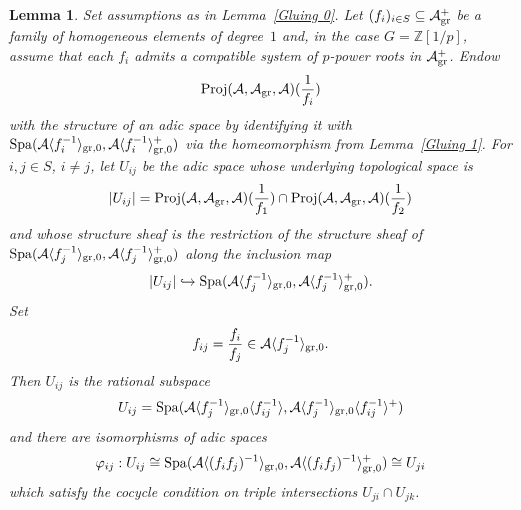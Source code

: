 \documentclass[12pt,twoside,a4paper]{article}
\newtheorem{lemma}[thm]{Lemma}
\theoremstyle{definition}
\theoremstyle{remark}
\newcommand\gr{{\rm gr}}
\newcommand\Proj{{\rm Proj}}
\newcommand\Spa{{\rm Spa}}
\begin{document}
\begin{lemma}\label{Gluing 1, part 4}Set assumptions as in Lemma~\ref{Gluing 0}. Let $(f_{i})_{i\in S} \subseteq \mathcal{A}_{\gr}^{+}$ be a family of homogeneous elements of degree~$1$ and, in the case $G=\mathbb{Z}[1/p]$, assume that each $f_{i}$ admits a compatible system of $p$-power roots in $\mathcal{A}_{\gr}^{+}$. Endow \begin{equation*}\Proj(\mathcal{A}, \mathcal{A}_{\gr}, \mathcal{A})(\frac{1}{f_{i}})\end{equation*}with the structure of an adic space by identifying it with $\Spa(\mathcal{A}\langle f_{i}^{-1}\rangle_{\gr,0}, \mathcal{A}\langle f_{i}^{-1}\rangle_{\gr,0}^{+})$ via the homeomorphism from Lemma~\ref{Gluing 1}. For $i, j\in S$, $i\neq j$, let $U_{ij}$ be the adic space whose underlying topological space is \begin{equation*}\vert U_{ij}\vert=\Proj(\mathcal{A}, \mathcal{A}_{\gr}, \mathcal{A})(\frac{1}{f_{1}})\cap \Proj(\mathcal{A}, \mathcal{A}_{\gr}, \mathcal{A})(\frac{1}{f_{2}})\end{equation*}and whose structure sheaf is the restriction of the structure sheaf of $\Spa(\mathcal{A}\langle f_{j}^{-1}\rangle_{\gr,0}, \mathcal{A}\langle f_{j}^{-1}\rangle_{\gr,0}^{+})$ along the inclusion map \begin{equation*}\vert U_{ij}\vert\hookrightarrow \Spa(\mathcal{A}\langle f_{j}^{-1}\rangle_{\gr,0}, \mathcal{A}\langle f_{j}^{-1}\rangle_{\gr,0}^{+}).\end{equation*}Set \begin{equation*}f_{ij}=\frac{f_{i}}{f_{j}}\in \mathcal{A}\langle f_{j}^{-1}\rangle_{\gr,0}.\end{equation*}Then $U_{ij}$ is the rational subspace \begin{equation*}U_{ij}=\Spa(\mathcal{A}\langle f_{j}^{-1}\rangle_{\gr,0}\langle f_{ij}^{-1}\rangle, \mathcal{A}\langle f_{j}^{-1}\rangle_{\gr,0}\langle f_{ij}^{-1}\rangle^{+})\end{equation*}and there are isomorphisms of adic spaces\begin{equation*}\varphi_{ij}: U_{ij}\cong \Spa(\mathcal{A}\langle (f_{i}f_{j})^{-1}\rangle_{\gr,0}, \mathcal{A}\langle (f_{i}f_{j})^{-1}\rangle_{\gr,0}^{+})\cong U_{ji}\end{equation*}which satisfy the cocycle condition on triple intersections $U_{ji}\cap U_{jk}$. \end{lemma} 
\end{document}
